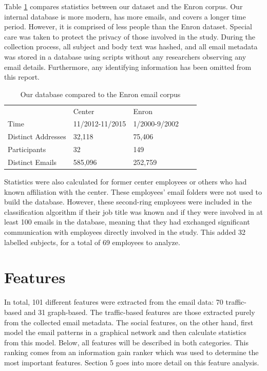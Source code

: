 \documentclass{article}
\begin{document}
\par
Table \ref{tab:db_stats} compares statistics between our dataset and the Enron corpus.  Our internal database is more modern, has more emails, and covers a longer time period.  However, it is comprised of less people than the Enron dataset.
Special care was taken to protect the privacy of those involved in the study.  During the collection process, all subject and body text was hashed, and all email metadata was stored in a database using scripts without any researchers observing any email details. Furthermore, any identifying information has been omitted from this report.

\begin{table}[H]
\centering
\caption{Our database compared to the Enron email corpus}
\label{tab:db_stats}
\begin{tabular}{l|l|l|ll}
\cline{2-3}
                                         & Center          & Enron         &  &  \\ \cline{1-3}
\multicolumn{1}{|l|}{Time}               & 11/2012-11/2015 & 1/2000-9/2002 &  &  \\
\multicolumn{1}{|l|}{Distinct Addresses} & 32,118          & 75,406        &  &  \\
\multicolumn{1}{|l|}{Participants}       & 32              & 149           &  &  \\
\multicolumn{1}{|l|}{Distinct Emails}    & 585,096         & 252,759       &  &  \\ \cline{1-3}
\end{tabular}
\end{table}

Statistics were also calculated for former center employees or others who had known affiliation with the center.  These employees' email folders were not used to build the database.  However, these second-ring employees were included in the classification algorithm if their job title was known and if they were involved in at least 100 emails in the database, meaning that they had exchanged significant communication with employees directly involved in the study.  This added 32 labelled subjects, for a total of 69 employees to analyze.

\section{Features} \label{Features}
In total, 101 different features were extracted from the email data: 70 traffic-based and 31 graph-based.  The traffic-based features are those extracted purely from the collected email metadata.  The social features, on the other hand, first model the email patterns in a graphical network and then calculate statistics from this model.  Below, all features will be described in both categories.  This ranking comes from an information gain ranker which was used to determine the most important features.  Section 5 goes into more detail on this feature analysis.
\end{document}
